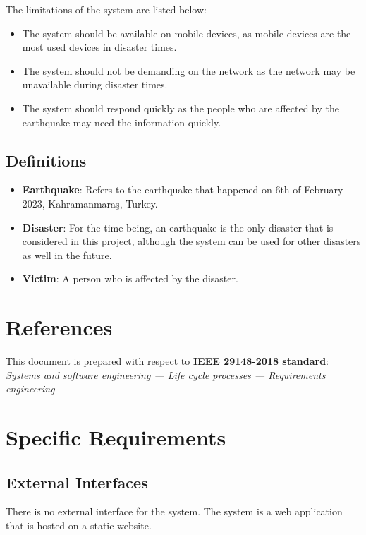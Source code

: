 \documentclass[a4paper]{article}
\begin{document}
                The limitations of the system are listed below:
                \begin{itemize}
                    \item The system should be available on mobile devices, as mobile devices are the most used devices in disaster times.
                    \item The system should not be demanding on the network as the network may be unavailable during disaster times.
                    \item The system should respond quickly as the people who are affected by the earthquake may need the information quickly.
                \end{itemize}

            \subsection{Definitions}
            \begin{itemize}
                \item \textbf{Earthquake}: Refers to the earthquake that happened on 6th of February 2023, Kahramanmaraş, Turkey.
                \item \textbf{Disaster}: For the time being, an earthquake is the only disaster that is considered in this project, although the system can be used for other disasters as well in the future.
                \item \textbf{Victim}: A person who is affected by the disaster.
            \end{itemize}

    \section{References}

    This document is prepared with respect to \textbf{IEEE 29148-2018 standard}: \textit{Systems and software engineering — Life cycle processes — Requirements engineering}

    \section{Specific Requirements}
        \subsection{External Interfaces}

        There is no external interface for the system. The system is a web application that is hosted on a static website.
\end{document}

